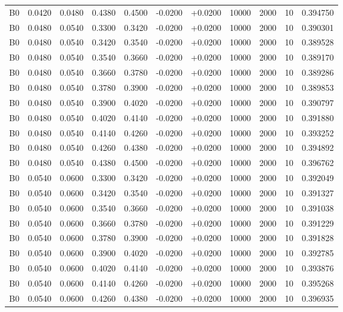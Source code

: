 \documentclass{article}
\begin{document}
\begin{longtable}{l r r r r r r r r r l}
B0 & 0.0420 & 0.0480 & 0.4380 & 0.4500 & -0.0200 & +0.0200 & 10000 & 2000 & 10 & 0.394750 \\
B0 & 0.0480 & 0.0540 & 0.3300 & 0.3420 & -0.0200 & +0.0200 & 10000 & 2000 & 10 & 0.390301 \\
B0 & 0.0480 & 0.0540 & 0.3420 & 0.3540 & -0.0200 & +0.0200 & 10000 & 2000 & 10 & 0.389528 \\
B0 & 0.0480 & 0.0540 & 0.3540 & 0.3660 & -0.0200 & +0.0200 & 10000 & 2000 & 10 & 0.389170 \\
B0 & 0.0480 & 0.0540 & 0.3660 & 0.3780 & -0.0200 & +0.0200 & 10000 & 2000 & 10 & 0.389286 \\
B0 & 0.0480 & 0.0540 & 0.3780 & 0.3900 & -0.0200 & +0.0200 & 10000 & 2000 & 10 & 0.389853 \\
B0 & 0.0480 & 0.0540 & 0.3900 & 0.4020 & -0.0200 & +0.0200 & 10000 & 2000 & 10 & 0.390797 \\
B0 & 0.0480 & 0.0540 & 0.4020 & 0.4140 & -0.0200 & +0.0200 & 10000 & 2000 & 10 & 0.391880 \\
B0 & 0.0480 & 0.0540 & 0.4140 & 0.4260 & -0.0200 & +0.0200 & 10000 & 2000 & 10 & 0.393252 \\
B0 & 0.0480 & 0.0540 & 0.4260 & 0.4380 & -0.0200 & +0.0200 & 10000 & 2000 & 10 & 0.394892 \\
B0 & 0.0480 & 0.0540 & 0.4380 & 0.4500 & -0.0200 & +0.0200 & 10000 & 2000 & 10 & 0.396762 \\
B0 & 0.0540 & 0.0600 & 0.3300 & 0.3420 & -0.0200 & +0.0200 & 10000 & 2000 & 10 & 0.392049 \\
B0 & 0.0540 & 0.0600 & 0.3420 & 0.3540 & -0.0200 & +0.0200 & 10000 & 2000 & 10 & 0.391327 \\
B0 & 0.0540 & 0.0600 & 0.3540 & 0.3660 & -0.0200 & +0.0200 & 10000 & 2000 & 10 & 0.391038 \\
B0 & 0.0540 & 0.0600 & 0.3660 & 0.3780 & -0.0200 & +0.0200 & 10000 & 2000 & 10 & 0.391229 \\
B0 & 0.0540 & 0.0600 & 0.3780 & 0.3900 & -0.0200 & +0.0200 & 10000 & 2000 & 10 & 0.391828 \\
B0 & 0.0540 & 0.0600 & 0.3900 & 0.4020 & -0.0200 & +0.0200 & 10000 & 2000 & 10 & 0.392785 \\
B0 & 0.0540 & 0.0600 & 0.4020 & 0.4140 & -0.0200 & +0.0200 & 10000 & 2000 & 10 & 0.393876 \\
B0 & 0.0540 & 0.0600 & 0.4140 & 0.4260 & -0.0200 & +0.0200 & 10000 & 2000 & 10 & 0.395268 \\
B0 & 0.0540 & 0.0600 & 0.4260 & 0.4380 & -0.0200 & +0.0200 & 10000 & 2000 & 10 & 0.396935 \\

\end{longtable}
\end{document}
